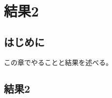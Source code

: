 \documentclass[thesis]{subfiles}
\begin{document}
\chapter{結果2}
\section{はじめに}
この章でやることと結果を述べる。
\section{結果2}
\end{document}
